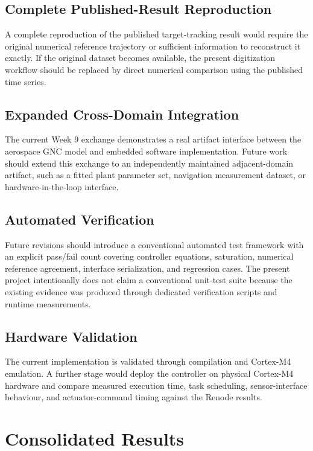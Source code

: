 \documentclass[11pt,a4paper]{article}
\begin{document}
\subsection{Complete Published-Result Reproduction}

A complete reproduction of the published target-tracking result would require the original numerical reference trajectory or sufficient information to reconstruct it exactly. If the original dataset becomes available, the present digitization workflow should be replaced by direct numerical comparison using the published time series.

\subsection{Expanded Cross-Domain Integration}

The current Week 9 exchange demonstrates a real artifact interface between the aerospace GNC model and embedded software implementation\cite{assignment}. Future work should extend this exchange to an independently maintained adjacent-domain artifact, such as a fitted plant parameter set, navigation measurement dataset, or hardware-in-the-loop interface.

\subsection{Automated Verification}

Future revisions should introduce a conventional automated test framework with an explicit pass/fail count covering controller equations, saturation, numerical reference agreement, interface serialization, and regression cases. The present project intentionally does not claim a conventional unit-test suite because the existing evidence was produced through dedicated verification scripts and runtime measurements.

\subsection{Hardware Validation}

The current implementation is validated through compilation and Cortex-M4 emulation\cite{arm_m4_trm,renode_exec}. A further stage would deploy the controller on physical Cortex-M4 hardware and compare measured execution time, task scheduling, sensor-interface behaviour, and actuator-command timing against the Renode results.


\section{Consolidated Results}
\end{document}

